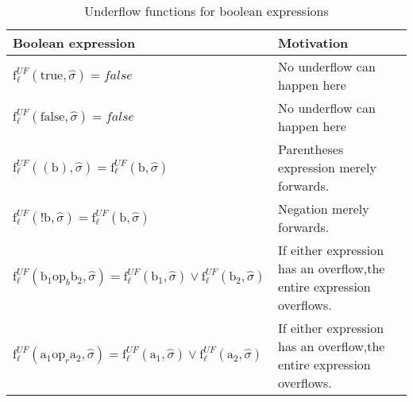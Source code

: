 \begin{table}[h]
\begin{tabular}{| l | l |}
  \hline
  Boolean expression & Motivation\\
  \hline
  \hline
  $\text{f}_\ell^{UF} (\text{true},\widehat{\sigma}) = false $ & No underflow can happen here\\ 
  \hline
  $\text{f}_\ell^{UF} (\text{false},\widehat{\sigma}) = false $ & No underflow can happen here\\ 
  \hline
  $\text{f}_\ell^{UF} ((\text{b}),\widehat{\sigma}) = \text{f}_\ell^{UF} (\text{b}, \widehat{\sigma}) $ & Parentheses expression merely forwards.\\ 
  \hline
    $\text{f}_\ell^{UF} (\text{!b},\widehat{\sigma}) = \text{f}_\ell^{UF} (\text{b}, \widehat{\sigma}) $ & Negation merely forwards.\\ 
  \hline
   $\text{f}_\ell^{UF} (\text{b}_1 \text{op}_b \text{b}_2, \widehat{\sigma}) = \text{f}_\ell^{UF} (\text{b}_1, \widehat{\sigma}) \vee \text{f}_\ell^{UF} (\text{b}_2, \widehat{\sigma})$ & If either expression has an overflow,the entire expression overflows.\\     
  \hline
     $\text{f}_\ell^{UF} (\text{a}_1 \text{op}_r \text{a}_2, \widehat{\sigma}) = \text{f}_\ell^{UF} (\text{a}_1, \widehat{\sigma}) \vee \text{f}_\ell^{UF} (\text{a}_2, \widehat{\sigma})$ & If either expression has an overflow,the entire expression overflows.\\     
  \hline
\end{tabular}
\centering
\caption{Underflow functions for boolean expressions}
\label{table:underflow_functions_boolean_expressions}
\end{table}




